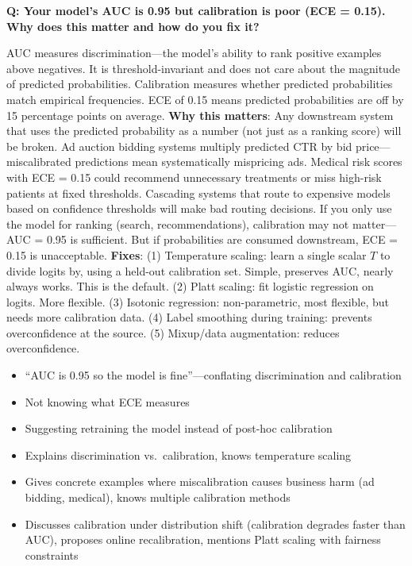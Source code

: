 \begin{interviewq}
\textbf{Q: Your model's AUC is 0.95 but calibration is poor (ECE = 0.15). Why does this matter and how do you fix it?}

 \quad {} \quad \badgefreq{\freqhigh}

\stronganswer AUC measures discrimination---the model's ability to rank positive examples above negatives. It is threshold-invariant and does not care about the magnitude of predicted probabilities. Calibration measures whether predicted probabilities match empirical frequencies. ECE of 0.15 means predicted probabilities are off by 15 percentage points on average. \textbf{Why this matters}: Any downstream system that uses the predicted probability as a number (not just as a ranking score) will be broken. Ad auction bidding systems multiply predicted CTR by bid price---miscalibrated predictions mean systematically mispricing ads. Medical risk scores with ECE = 0.15 could recommend unnecessary treatments or miss high-risk patients at fixed thresholds. Cascading systems that route to expensive models based on confidence thresholds will make bad routing decisions. If you only use the model for ranking (search, recommendations), calibration may not matter---AUC = 0.95 is sufficient. But if probabilities are consumed downstream, ECE = 0.15 is unacceptable. \textbf{Fixes}: (1) Temperature scaling: learn a single scalar $T$ to divide logits by, using a held-out calibration set. Simple, preserves AUC, nearly always works. This is the default. (2) Platt scaling: fit logistic regression on logits. More flexible. (3) Isotonic regression: non-parametric, most flexible, but needs more calibration data. (4) Label smoothing during training: prevents overconfidence at the source. (5) Mixup/data augmentation: reduces overconfidence.

\redflags
\begin{itemize}
    \item ``AUC is 0.95 so the model is fine''---conflating discrimination and calibration
    \item Not knowing what ECE measures
    \item Suggesting retraining the model instead of post-hoc calibration
\end{itemize}


\goodgreat
\begin{itemize}
    \item {} Explains discrimination vs.\ calibration, knows temperature scaling
    \item {} Gives concrete examples where miscalibration causes business harm (ad bidding, medical), knows multiple calibration methods
    \item {} Discusses calibration under distribution shift (calibration degrades faster than AUC), proposes online recalibration, mentions Platt scaling with fairness constraints
\end{itemize}


\end{interviewq}
